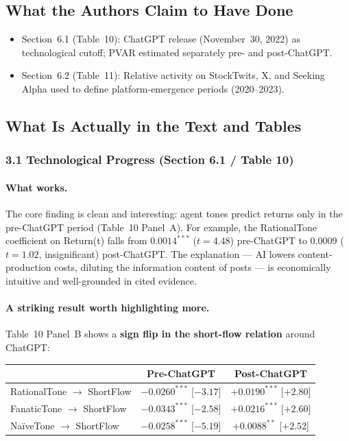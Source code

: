 \documentclass[11pt]{article}
\begin{document}
\subsection*{What the Authors Claim to Have Done}
\begin{itemize}
  \item Section~6.1 (Table~10): ChatGPT release (November~30, 2022) as
    technological cutoff; PVAR estimated separately pre- and post-ChatGPT.
  \item Section~6.2 (Table~11): Relative activity on StockTwits, X, and
    Seeking Alpha used to define platform-emergence periods (2020--2023).
\end{itemize}

\subsection*{What Is Actually in the Text and Tables}

\subsubsection*{3.1 Technological Progress (Section 6.1 / Table 10)}

\paragraph{What works.}
The core finding is clean and interesting: agent tones predict returns
only in the pre-ChatGPT period (Table~10 Panel~A). For example, the
RationalTone coefficient on Return(t) falls from $0.0014^{***}$
($t=4.48$) pre-ChatGPT to $0.0009$ ($t=1.02$, insignificant)
post-ChatGPT. The explanation --- AI lowers content-production costs,
diluting the information content of posts --- is economically intuitive
and well-grounded in cited evidence.

\paragraph{A striking result worth highlighting more.}
Table~10 Panel~B shows a \textbf{sign flip in the short-flow relation}
around ChatGPT:

\begin{center}
\begin{tabular}{lcc}
\toprule
 & Pre-ChatGPT & Post-ChatGPT \\
\midrule
RationalTone $\to$ ShortFlow & $-0.0260^{***}$ [$-3.17$] & $+0.0190^{***}$ [$+2.80$] \\
FanaticTone $\to$ ShortFlow  & $-0.0343^{***}$ [$-2.58$] & $+0.0216^{***}$ [$+2.60$] \\
Na\"{i}veTone $\to$ ShortFlow & $-0.0258^{***}$ [$-5.19$] & $+0.0088^{**}$ [$+2.52$] \\
\bottomrule
\end{tabular}
\end{center}
\end{document}
